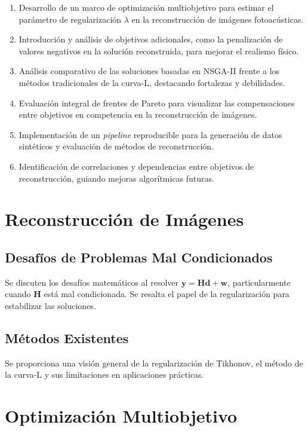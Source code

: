 \begin{enumerate}[start=1,label={C\arabic*:},wide = 0pt, leftmargin = 3em]
    \item Desarrollo de un marco de optimización multiobjetivo para estimar el parámetro de regularización \( \lambda \) en la reconstrucción de imágenes fotoacústicas.
    \item Introducción y análisis de objetivos adicionales, como la penalización de valores negativos en la solución reconstruida, para mejorar el realismo físico.
    \item Análisis comparativo de las soluciones basadas en NSGA-II frente a los métodos tradicionales de la curva-L, destacando fortalezas y debilidades.
    \item Evaluación integral de frentes de Pareto para visualizar las compensaciones entre objetivos en competencia en la reconstrucción de imágenes.
    \item Implementación de un \textit{pipeline} reproducible para la generación de datos sintéticos y evaluación de métodos de reconstrucción.
    \item Identificación de correlaciones y dependencias entre objetivos de reconstrucción, guiando mejoras algorítmicas futuras.
\end{enumerate}

\section{Reconstrucción de Imágenes} \label{sec:back}

\subsection*{Desafíos de Problemas Mal Condicionados}

Se discuten los desafíos matemáticos al resolver \( \mathbf{y} = \mathbf{H} \mathbf{d} + \mathbf{w} \), particularmente cuando \( \mathbf{H} \) está mal condicionada. Se resalta el papel de la regularización para estabilizar las soluciones.

\subsection*{Métodos Existentes}

Se proporciona una visión general de la regularización de Tikhonov, el método de la curva-L y sus limitaciones en aplicaciones prácticas.

\section{Optimización Multiobjetivo} \label{sec:back}

